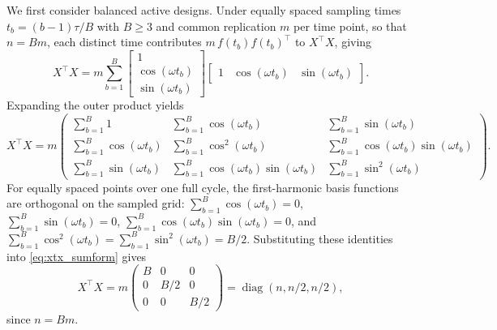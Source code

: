 \documentclass{article}
\begin{document}
We first consider balanced active designs. Under equally spaced sampling times
$t_b=(b-1)\tau/B$ with $B\geq 3$ and common replication $m$ per time point, so
that $n=Bm$, each distinct time contributes
$m\,f(t_b)f(t_b)^\top$ to $X^\top X$, giving
\begin{equation}
X^\top X
=
m\sum_{b=1}^B
\begin{bmatrix}
1 \\
\cos(\omega t_b) \\
\sin(\omega t_b)
\end{bmatrix}
\begin{bmatrix}
1 & \cos(\omega t_b) & \sin(\omega t_b)
\end{bmatrix}.
\label{eq:xtx_expand}
\end{equation}
Expanding the outer product yields
\begin{equation}
X^\top X
=
m
\begin{pmatrix}
\sum_{b=1}^B 1 &
\sum_{b=1}^B \cos(\omega t_b) &
\sum_{b=1}^B \sin(\omega t_b) \\[6pt]
\sum_{b=1}^B \cos(\omega t_b) &
\sum_{b=1}^B \cos^2(\omega t_b) &
\sum_{b=1}^B \cos(\omega t_b)\sin(\omega t_b) \\[6pt]
\sum_{b=1}^B \sin(\omega t_b) &
\sum_{b=1}^B \cos(\omega t_b)\sin(\omega t_b) &
\sum_{b=1}^B \sin^2(\omega t_b)
\end{pmatrix}.
\label{eq:xtx_sumform}
\end{equation}
For equally spaced points over one full cycle, the first-harmonic basis
functions are orthogonal on the sampled grid:
$\sum_{b=1}^B \cos(\omega t_b)=0$,
$\sum_{b=1}^B \sin(\omega t_b)=0$,
$\sum_{b=1}^B \cos(\omega t_b)\sin(\omega t_b)=0$,
and
$\sum_{b=1}^B \cos^2(\omega t_b)=\sum_{b=1}^B \sin^2(\omega t_b)=B/2$.
Substituting these identities into \eqref{eq:xtx_sumform} gives
\begin{equation}
X^\top X
=
m
\begin{pmatrix}
B & 0 & 0 \\
0 & B/2 & 0 \\
0 & 0 & B/2
\end{pmatrix}
=
\operatorname{diag}(n,n/2,n/2),
\label{eq:xtx_balanced}
\end{equation}
since $n=Bm$.
\end{document}

